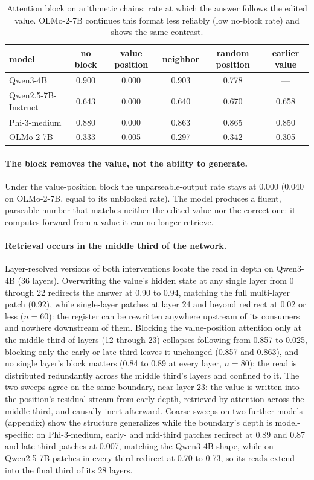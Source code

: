 \documentclass{article}
\begin{document}
\begin{table}[t]
\centering
\small
\caption{Attention block on arithmetic chains: rate at which the answer follows the edited value. OLMo-2-7B continues this format less reliably (low no-block rate) and shows the same contrast.}
\label{tab:knockout}
\begin{tabular}{lccccc}
\toprule
model & no block & value position & neighbor & random position & earlier value \\
\midrule
Qwen3-4B & 0.900 & 0.000 & 0.903 & 0.778 & --- \\
Qwen2.5-7B-Instruct & 0.643 & 0.000 & 0.640 & 0.670 & 0.658 \\
Phi-3-medium & 0.880 & 0.000 & 0.863 & 0.865 & 0.850 \\
OLMo-2-7B & 0.333 & 0.005 & 0.297 & 0.342 & 0.305 \\
\bottomrule
\end{tabular}
\end{table}

\paragraph{The block removes the value, not the ability to generate.} Under the value-position block the unparseable-output rate stays at 0.000 (0.040 on OLMo-2-7B, equal to its unblocked rate). The model produces a fluent, parseable number that matches neither the edited value nor the correct one: it computes forward from a value it can no longer retrieve.

\paragraph{Retrieval occurs in the middle third of the network.} Layer-resolved versions of both interventions locate the read in depth on Qwen3-4B (36 layers). Overwriting the value's hidden state at any single layer from 0 through 22 redirects the answer at 0.90 to 0.94, matching the full multi-layer patch (0.92), while single-layer patches at layer 24 and beyond redirect at 0.02 or less ($n=60$): the register can be rewritten anywhere upstream of its consumers and nowhere downstream of them. Blocking the value-position attention only at the middle third of layers (12 through 23) collapses following from 0.857 to 0.025, blocking only the early or late third leaves it unchanged (0.857 and 0.863), and no single layer's block matters (0.84 to 0.89 at every layer, $n=80$): the read is distributed redundantly across the middle third's layers and confined to it. The two sweeps agree on the same boundary, near layer 23: the value is written into the position's residual stream from early depth, retrieved by attention across the middle third, and causally inert afterward. Coarse sweeps on two further models (appendix) show the structure generalizes while the boundary's depth is model-specific: on Phi-3-medium, early- and mid-third patches redirect at 0.89 and 0.87 and late-third patches at 0.007, matching the Qwen3-4B shape, while on Qwen2.5-7B patches in every third redirect at 0.70 to 0.73, so its reads extend into the final third of its 28 layers.
\end{document}
